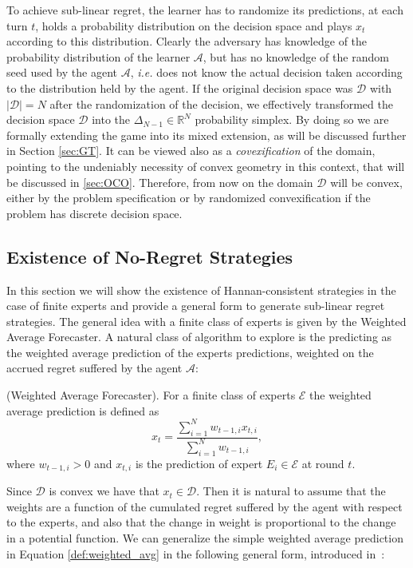 To achieve sub-linear regret, the learner has to randomize its predictions, at each turn $t$, holds a probability distribution on the decision space and plays $x_t$ according to this distribution. Clearly the adversary has knowledge of the probability distribution of the learner $\mathcal A$, but has no knowledge of the random seed used by the agent $\mathcal A$, \emph{i.e.} does not know the actual decision taken according to the distribution held by the agent. If the original decision space was $\mathcal D$ with $|\mathcal D|=N$ after the randomization of the decision, we effectively transformed the decision space $\mathcal D$ into the $\Delta_{N-1}\in\mathbb R^{N}$ probability simplex. By doing so we are formally extending the game into its mixed extension, as will be discussed further in Section \ref{sec:GT}. It can be viewed also as a \emph{covexification} of the domain, pointing to the undeniably necessity of convex geometry in this context, that will be discussed in \ref{sec:OCO}. Therefore, from now on the domain $\mathcal D$ will be convex, either by the problem specification or by randomized convexification if the problem has discrete decision space.

\subsection{Existence of No-Regret Strategies}\label{sec:existence_of_no_regret}
In this section we will show the existence of Hannan-consistent strategies in the case of finite experts and provide a general form to generate sub-linear regret strategies. 
The general idea with a finite class of experts is given by the Weighted Average Forecaster. A natural class of algorithm to explore is the predicting as the weighted average prediction of the experts predictions, weighted on the accrued regret suffered by the agent $\mathcal A$:

\begin{definition}(Weighted Average Forecaster).\label{def:weighted_avg}
For a finite class of experts $\mathcal E$ the weighted average prediction is defined as
\begin{equation}
	x_t = \frac{\sum\limits_{i=1}^{N}w_{t-1,i}x_{t,i}}{\sum\limits_{i=1}^{N}w_{t-1,i}},
\end{equation}
where $w_{t-1,i}>0$ and $x_{t,i}$ is the prediction of expert $E_i\in\mathcal E$ at round $t$. 
\end{definition}

Since $\mathcal D$ is convex we have that $x_t\in\mathcal D$.
Then it is natural to assume that the weights are a function of the cumulated regret suffered by the agent with respect to the experts, and also that the change in weight is proportional to the change in a potential function.
We can generalize the simple weighted average prediction in Equation \eqref{def:weighted_avg} in the following general form, introduced in~\cite{cesa2003potential}:

